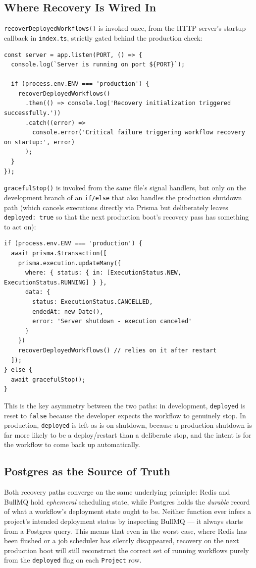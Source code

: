 \subsection{Where Recovery Is Wired In}

\texttt{recoverDeployedWorkflows()} is invoked once, from the HTTP server's startup callback in \texttt{index.ts}, strictly gated behind the production check:

\begin{lstlisting}
const server = app.listen(PORT, () => {
  console.log(`Server is running on port ${PORT}`);

  if (process.env.ENV === 'production') {
    recoverDeployedWorkflows()
      .then(() => console.log('Recovery initialization triggered successfully.'))
      .catch((error) =>
        console.error('Critical failure triggering workflow recovery on startup:', error)
      );
  }
});
\end{lstlisting}

\texttt{gracefulStop()} is invoked from the same file's signal handlers, but only on the development branch of an \texttt{if/else} that also handles 
the production shutdown path (which cancels executions directly via Prisma but deliberately leaves \texttt{deployed: true} so that the next production
 boot's recovery pass has something to act on):

\begin{lstlisting}
if (process.env.ENV === 'production') {
  await prisma.$transaction([
    prisma.execution.updateMany({
      where: { status: { in: [ExecutionStatus.NEW, ExecutionStatus.RUNNING] } },
      data: {
        status: ExecutionStatus.CANCELLED,
        endedAt: new Date(),
        error: 'Server shutdown - execution canceled'
      }
    })
    recoverDeployedWorkflows() // relies on it after restart
  ]);
} else {
  await gracefulStop();
}
\end{lstlisting}

This is the key asymmetry between the two paths: in development, \texttt{deployed} is reset to \texttt{false} because the developer expects 
the workflow to genuinely stop. In production, \texttt{deployed} is left as-is on shutdown, because a production shutdown is far more likely 
to be a deploy/restart than a deliberate stop, and the intent is for the workflow to come back up automatically.

\subsection{Postgres as the Source of Truth}

Both recovery paths converge on the same underlying principle: Redis and BullMQ hold \emph{ephemeral} scheduling state, while Postgres holds 
the \emph{durable} record of what a workflow's deployment state ought to be. Neither function ever infers a project's intended deployment status 
by inspecting BullMQ — it always starts from a Postgres query. This means that even in the worst case, where Redis has been flushed or a job 
scheduler has silently disappeared, recovery on the next production boot will still reconstruct the correct set of running workflows purely 
from the \texttt{deployed} flag on each \texttt{Project} row.